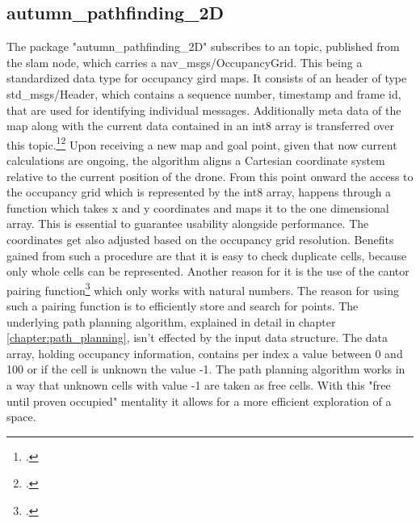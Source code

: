 \subsection{autumn\_pathfinding\_2D}
The package "autumn\_pathfinding\_2D" subscribes to an topic, published from the slam node, which carries a nav\_msgs/OccupancyGrid. This being a standardized data type for occupancy gird maps. It consists of an header of type std\_msgs/Header, which contains a sequence number, timestamp and frame id, that are used for identifying individual messages. Additionally meta data of the map along with the current data contained in an int8 array is transferred over this topic.\footcite{rosNavMsgsOccupancyGrid2021}\footcite{rosStdMsgsHeader2021}\newline
Upon receiving a new map and goal point, given that now current calculations are ongoing, the algorithm aligns a Cartesian coordinate system relative to the current position of the drone. From this point onward the access to the occupancy grid which is represented by the int8 array, happens through a function which takes x and y coordinates and maps it to the one dimensional array. This is essential to guarantee usability alongside performance.\newline
The coordinates get also adjusted based on the occupancy grid resolution. Benefits gained from such a procedure are that it is easy to check duplicate cells, because only whole cells can be represented. Another reason for it is the use of the cantor pairing function\footcite{Szudzik2017} which only works with natural numbers. The reason for using such a pairing function is to efficiently store and search for points.  
The underlying path planning algorithm, explained in detail in chapter \ref{chapter:path_planning}, isn't effected by the input data structure.       
The data array, holding occupancy information, contains per index a value between 0 and 100 or if the cell is unknown the value -1. The path planning algorithm works in a way that unknown cells with value -1 are taken as free cells. With this "free until proven occupied" mentality it allows for a more efficient exploration of a space.

